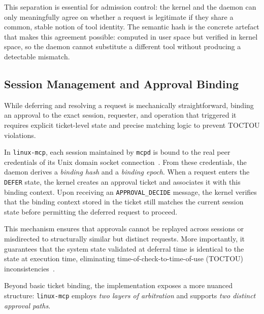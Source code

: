 This separation is essential for admission control: the kernel and the daemon can only meaningfully agree on whether a request is legitimate if they share a common, stable notion of tool identity.
The semantic hash is the concrete artefact that makes this agreement possible: computed in user space but verified in kernel space, so the daemon cannot substitute a different tool without producing a detectable mismatch.




\subsection{Session Management and Approval Binding}

While deferring and resolving a request is mechanically straightforward, binding an approval to the exact session, requester, and operation that triggered it requires explicit ticket-level state and precise matching logic to prevent TOCTOU violations.

In \texttt{linux-mcp}, each session maintained by \texttt{mcpd} is bound to the real peer credentials of its Unix domain socket connection~\cite{stevens2013unix}.
From these credentials, the daemon derives a \emph{binding hash} and a \emph{binding epoch}.
When a request enters the \texttt{DEFER} state, the kernel creates an approval ticket and associates it with this binding context.
Upon receiving an \texttt{APPROVAL\_DECIDE} message, the kernel verifies that the binding context stored in the ticket still matches the current session state before permitting the deferred request to proceed.

This mechanism ensures that approvals cannot be replayed across sessions or misdirected to structurally similar but distinct requests.
More importantly, it guarantees that the system state validated at deferral time is identical to the state at execution time, eliminating time-of-check-to-time-of-use (TOCTOU) inconsistencies~\cite{bishop2003computer, lee2021exprace}.

Beyond basic ticket binding, the implementation exposes a more nuanced structure: \texttt{linux-mcp} employs \emph{two layers of arbitration} and supports \emph{two distinct approval paths}.

